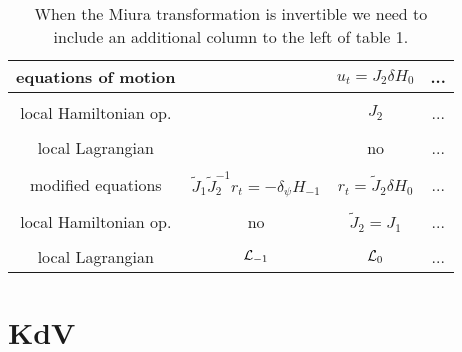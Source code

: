 \documentclass[a4paper,12pt]{article}
\begin{document}
\begin{table}
\begin{tabular}{c||c|c|c}
equations of motion    &  & $u_t = J_2 \delta H_0 $ & ...  \\
\hline
\\[-4.5mm] local Hamiltonian op.   & &  $J_2$ & ...
\\ \hline
\\[-4.5mm] local Lagrangian &  & no & ...
\\ \hline\hline
\\[-4.5mm] modified equations & $\tilde{J}_1  \tilde{J}_2^{-1} r_t =
- \delta_\psi H_{-1} $& $r_t = \tilde{J}_2 \delta H_0$ & ...
\\ \hline
\\ [-4.5mm] local Hamiltonian op.  & no & $\tilde{J}_2 = J_1$ & ...
\\ \hline
\\ [-4.5mm] local Lagrangian & ${\cal L}_{-1}$ & ${\cal L}_0$ & ...
\end{tabular}
\caption{ When the Miura transformation is invertible we need to
include an additional column to the left of table 1.}
\label{table1b}
\end{table}

\section{KdV}
\label{sec-kdv}
\end{document}

